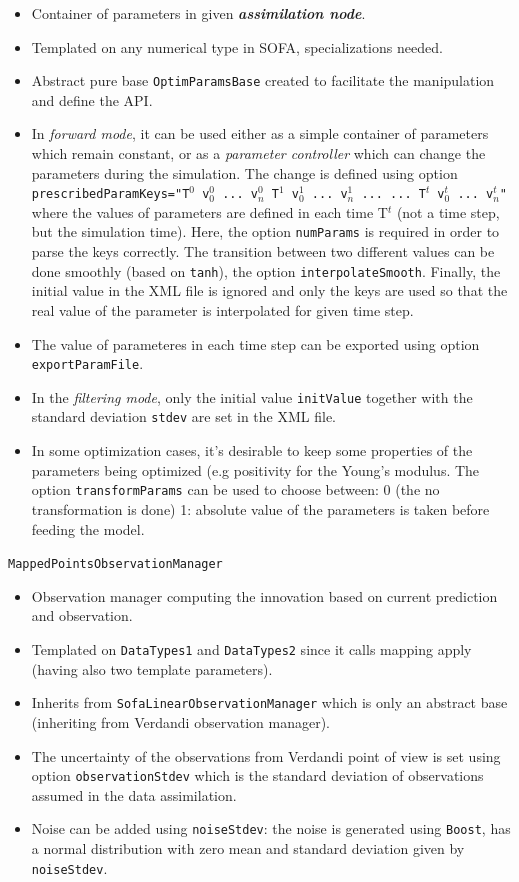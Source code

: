 \documentclass[10pt]{article}
\def\asn{\textit{\textbf{assimilation node}}}
\def\mobs{\texttt{MappedPointsObservationManager}}
\begin{document}
\begin{itemize}
\item Container of parameters in given \asn. 
\item Templated on any numerical type in SOFA, specializations needed.
\item Abstract pure base \texttt{OptimParamsBase} created to facilitate the manipulation and define the API.
\item In \emph{forward mode}, it can be used either as a simple container of parameters which remain constant, or as a \emph{parameter controller} which can change 
the parameters during the simulation. The change is defined using option \texttt{prescribedParamKeys="T$^0$ v$_0^0$ ... v$_n^0$  T$^1$ v$_0^1$ ... v$_n^1$ ... ... T$^t$ v$^t_0$ ... v$^t_n$"} where the 
values of parameters are defined in each time T$^t$ (not a time step, but the simulation time). Here, the option \texttt{numParams} is required in order to parse the keys correctly. 
The transition between two different values can be done smoothly (based on \texttt{tanh}), the option \texttt{interpolateSmooth}.
Finally, the initial value in the XML  file is ignored and only the keys are used so that the 
real value of the parameter is interpolated for given time step.
\item The value of parameteres in each time step can be exported using option \texttt{exportParamFile}.
\item In the \emph{filtering mode}, only the initial value \texttt{initValue} together with the standard deviation \texttt{stdev} are set in the XML file.
\item In some optimization cases, it's desirable to keep some properties of the parameters being optimized (e.g positivity for the Young's modulus. 
The option \texttt{transformParams} can be used to choose between: 0 (the no transformation is done) 1: absolute value of the parameters is taken
before feeding the model.
\end{itemize}
\medskip
{\large\mobs}
\begin{itemize}
\item Observation manager computing the innovation based on current prediction and observation.
\item Templated on \texttt{DataTypes1} and \texttt{DataTypes2} since it calls mapping apply (having also two template parameters).
\item Inherits from \texttt{SofaLinearObservationManager} which is only an abstract base (inheriting from Verdandi observation manager).
\item The uncertainty of the observations from Verdandi point of view is set using option \texttt{observationStdev} which is the standard deviation of
observations assumed in the data assimilation. 
\item Noise can be added using \texttt{noiseStdev}: the noise is generated using \texttt{Boost}, has a normal distribution with zero mean and standard
deviation given by \texttt{noiseStdev}. 
\end{itemize}
\end{document}
